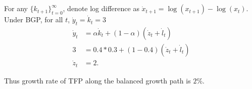 \documentclass{ltjsarticle}
\begin{document}
\section{} %

\section{} %
For any $\{k_{t+1} \}^{\infty}_{t=0}$, denote log difference as $\dot{x}_{t+1}= \log(x_{t+1})-\log(x_{t})$.\\
Under BGP, for all $t$,  $\dot{y}_t = \dot{k}_t = 3$
\begin{align*}
    \dot{y}_t &= \alpha \dot{k}_t + (1-\alpha)(\dot{z}_t + \dot{l}_t)\\
    3&= 0.4*0.3 + (1-0.4)(\dot{z}_t + \dot{l}_t)\\
    \dot{z}_t &= 2.
\end{align*}

Thus growth rate of TFP along the balanced growth path is $2\%$.
\end{document}
